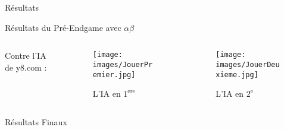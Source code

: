 \documentclass{beamer}
\begin{document}
\begin{frame}{Résultats}
    \begin{block}{Résultats du Pré-Endgame avec $\alpha\beta$}
        \begin{columns}
            \begin{column}{0.4\textwidth}
                \vspace{+1.6em}
                \centering
                \small Contre l'IA de y8.com :
            \end{column}
            \begin{column}{0.3\textwidth}
                \begin{minipage}[t]{\textwidth}
                \centering
                \begin{figure}
                    \centering
                    \texttt{[image: images/JouerPremier.jpg]}
                    \caption{\small L'IA en $1^{\text{ere}}$}
                    \label{fig:enter-label}
                \end{figure}
                \end{minipage}
            \end{column}
            \begin{column}{0.3\textwidth}
                \begin{minipage}[t]{\textwidth}
                \centering
                \begin{figure}
                    \centering
                    \texttt{[image: images/JouerDeuxieme.jpg]}
                    \caption{\small L'IA en $2^\text{e}$}
                \end{figure}
                \end{minipage}
            \end{column}
        \end{columns}
    \end{block}
    \begin{block}{Résultats Finaux}
    \end{block}
\end{frame}
\end{document}
